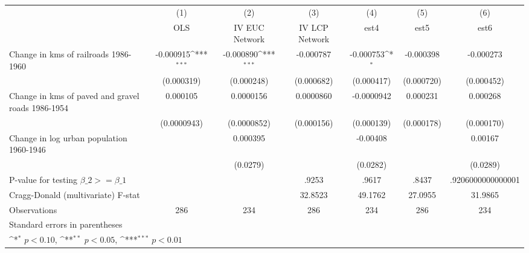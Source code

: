 {
\def\sym#1{\ifmmode^{#1}\else\(^{#1}\)\fi}
\begin{tabular}{l*{6}{c}}
\hline\hline
                &\multicolumn{1}{c}{(1)}&\multicolumn{1}{c}{(2)}&\multicolumn{1}{c}{(3)}&\multicolumn{1}{c}{(4)}&\multicolumn{1}{c}{(5)}&\multicolumn{1}{c}{(6)}\\
                &\multicolumn{1}{c}{OLS}&\multicolumn{1}{c}{IV EUC Network}&\multicolumn{1}{c}{IV LCP Network}&\multicolumn{1}{c}{est4}&\multicolumn{1}{c}{est5}&\multicolumn{1}{c}{est6}\\
\hline
Change in kms of railroads 1986-1960&-0.000915\sym{***}&-0.000890\sym{***}&-0.000787         &-0.000753\sym{*}  &-0.000398         &-0.000273         \\
                &(0.000319)         &(0.000248)         &(0.000682)         &(0.000417)         &(0.000720)         &(0.000452)         \\
[1em]
Change in kms of paved and gravel roads 1986-1954& 0.000105         &0.0000156         &0.0000860         &-0.0000942         & 0.000231         & 0.000268         \\
                &(0.0000943)         &(0.0000852)         &(0.000156)         &(0.000139)         &(0.000178)         &(0.000170)         \\
[1em]
Change in log urban population 1960-1946&                  & 0.000395         &                  & -0.00408         &                  &  0.00167         \\
                &                  & (0.0279)         &                  & (0.0282)         &                  & (0.0289)         \\
\hline
P-value for testing $\beta\_{2} >= \beta\_{1}$&                  &                  &    .9253         &    .9617         &    .8437         &.9206000000000001         \\
Cragg-Donald (multivariate) F-stat&                  &                  &  32.8523         &  49.1762         &  27.0955         &  31.9865         \\
Observations    &      286         &      234         &      286         &      234         &      286         &      234         \\
\hline\hline
\multicolumn{7}{l}{\footnotesize Standard errors in parentheses}\\
\multicolumn{7}{l}{\footnotesize \sym{*} \(p<0.10\), \sym{**} \(p<0.05\), \sym{***} \(p<0.01\)}\\
\end{tabular}
}
